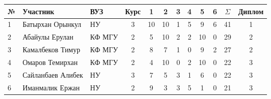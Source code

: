 \begin{center}
\begin{tabular}{|l|l|l|c|c|c|c|c|c|c|c|c|}
\hline
№ & Участник & ВУЗ & Курс & 1 & 2 & 3 & 4 & 5 & 6 & $\Sigma$ & Диплом \\
\hline
1 & Батырхан Орынкул & НУ & 3 & 10 & 10 & 1 & 5 & 9 & 6 & 41 & 1  \\
\hline
2 & Абайулы Ерулан & КФ МГУ & 2 & 5 & 10 & 2 & 2 & 10 & 0 & 29 & 2  \\
\hline
3 & Камалбеков Тимур & КФ МГУ & 2 & 8 & 7 & 1 & 0 & 9 & 2 & 27 & 2  \\
\hline
4 & Омаров Темирхан & КФ МГУ & 2 & 4 & 10 & 0 & 2 & 10 & 0 & 22 & 3  \\
\hline
5 & Сайланбаев Алибек & НУ & 3 & 7 & 5 & 3 & 1 & 6 & 0 & 22 & 3  \\
\hline
6 & Иманмалик Ержан & НУ & 2 & 9 & 3 & 3 & 5 & 1 & 0 & 21 & 3  \\
\hline
\end{tabular}
\end{center}
